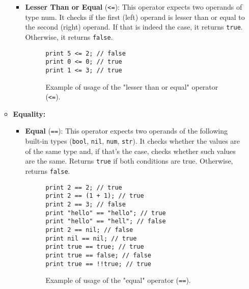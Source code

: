 \begin{itemize}
\begin{itemize}
\begin{itemize}
                    
                    \item \textbf{Lesser Than or Equal} (\texttt{<=}): This operator expects two operands of type num. It checks if the first (left) operand is lesser than or equal to the second (right) operand. If that is indeed the case, it returns \texttt{true}. Otherwise, it returns \texttt{false}.
                    \begin{figure}[H]
                        \centering
                        \begin{lstlisting}
print 5 <= 2; // false
print 0 <= 0; // true
print 1 <= 3; // true
                        \end{lstlisting}
                        \caption{Example of usage of the "lesser than or equal" operator (\texttt{<=}).}
                    \end{figure}
                \end{itemize}
                
            \item \textbf{Equality:}
                \begin{itemize}
                    \item \textbf{Equal} (\texttt{==}): This operator expects two operands of the following built-in types (\texttt{bool}, \texttt{nil}, \texttt{num}, \texttt{str}). It checks whether the values are of the same type and, if that's the case, checks whether such values are the same. Returns \texttt{true} if both conditions are true. Otherwise, returns \texttt{false}.
                    \begin{figure}[H]
                        \centering
                        \begin{lstlisting}
print 2 == 2; // true
print 2 == (1 + 1); // true
print 2 == 3; // false
print "hello" == "hello"; // true
print "hello" == "hell"; // false
print 2 == nil; // false
print nil == nil; // true
print true == true; // true
print true == false; // false
print true == !!true; // true
                        \end{lstlisting}
                        \caption{Example of usage of the "equal" operator (\texttt{==}).}
                    \end{figure}


\end{itemize}
\end{itemize}
\end{itemize}
